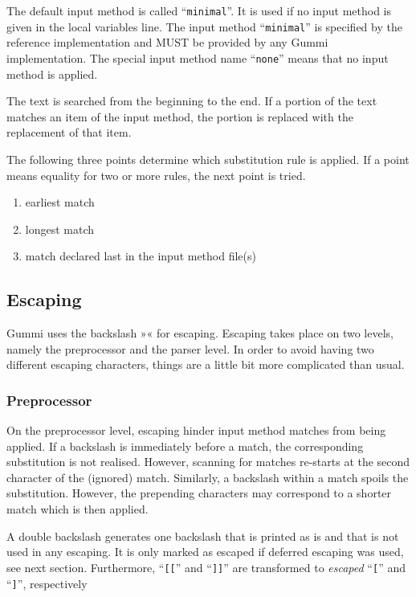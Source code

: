 \documentclass[12pt,openany]{book}
\begin{document}
The default input method is called ``\verb|minimal|''.  It is used if no input
method is given in the local variables line.  The input method
``\verb|minimal|'' is specified by the reference implementation and MUST be
provided by any Gummi implementation.  The special input method name
``\verb|none|'' means that no input method is applied.

The text is searched from the beginning to the end.  If a portion of the text
matches an item of the input method, the portion is replaced with the
replacement of that item.

The following three points determine which substitution rule is applied.  If a
point means equality for two or more rules, the next point is tried.

\begin{enumerate}
\item earliest match
\item longest match
\item match declared last in the input method file(s)
\end{enumerate}

\subsection{Escaping}

Gummi uses the backslash »« for escaping.  Escaping takes place on two
levels, namely the preprocessor and the parser level.  In order to avoid having
two different escaping characters, things are a little bit more complicated
than usual.

\subsubsection*{Preprocessor}

On the preprocessor level, escaping hinder input method matches from being
applied.  If a backslash is immediately before a match, the corresponding
substitution is not realised.  However, scanning for matches re-starts at the
second character of the (ignored) match.  Similarly, a backslash within a match
spoils the substitution.  However, the prepending characters may correspond to
a shorter match which is then applied.

A double backslash generates one backslash that is printed as is and that is
not used in any escaping.  It is only marked as escaped if deferred escaping
was used, see next section.  Furthermore, ``\verb|[[|'' and ``\verb|]]|'' are
transformed to \emph{escaped} ``\verb|[|'' and ``\verb|]|'', respectively
\end{document}
